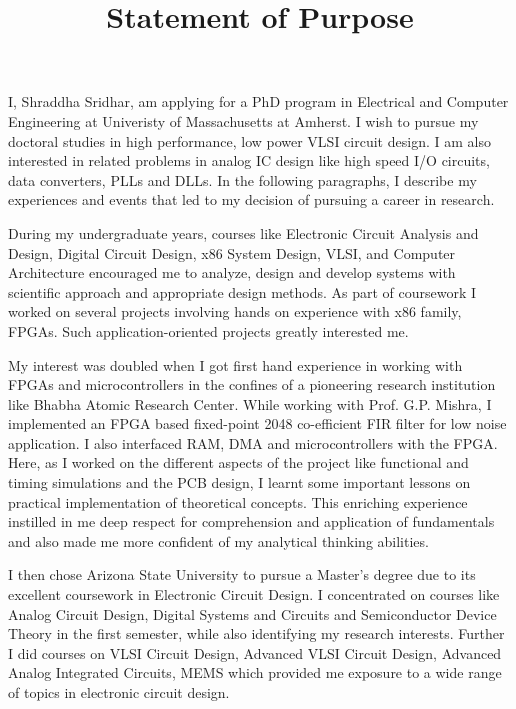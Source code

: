 \documentclass[11pt, letterpaper]{article}
\title{\textbf{Statement of Purpose}}
\date{}
\begin{document}
\maketitle
I, Shraddha Sridhar, am applying for a PhD program in Electrical and Computer Engineering at Univeristy of Massachusetts at Amherst. I wish to pursue my doctoral studies in high performance, low power VLSI circuit design. I am also interested in related problems in analog IC design like high speed I/O circuits, data converters, PLLs and DLLs. In the following paragraphs, I describe my experiences and events that led to my decision of pursuing a career in research. 

During my undergraduate years, courses like Electronic Circuit Analysis and Design, Digital Circuit Design, x86 System Design, VLSI, and Computer Architecture encouraged me to analyze, design and develop systems with scientific approach and appropriate design methods. As part of coursework I worked on several projects involving hands on experience with x86 family, FPGAs. Such application-oriented projects greatly interested me.

My interest was doubled when I got first hand experience in working with FPGAs and microcontrollers in the confines of a pioneering research institution like Bhabha Atomic Research Center. While working with Prof. G.P. Mishra, I implemented an FPGA based fixed-point 2048 co-efficient FIR filter for low noise application. I also interfaced RAM, DMA and microcontrollers with the FPGA.  Here, as I worked on the different aspects of the project like functional and timing simulations and the PCB design, I learnt some important lessons on practical implementation of theoretical concepts. This enriching experience instilled in me deep respect for comprehension and application of fundamentals and also made me more confident of my analytical thinking abilities.

I then chose Arizona State University to pursue a Master’s degree due to its excellent coursework in Electronic Circuit Design. I concentrated on courses like Analog Circuit Design, Digital Systems and Circuits and Semiconductor Device Theory in the first semester, while also identifying my research interests. Further I did courses on VLSI Circuit Design, Advanced VLSI Circuit Design, Advanced Analog Integrated Circuits, MEMS which provided me exposure to a wide range of topics in electronic circuit design.
\end{document}

